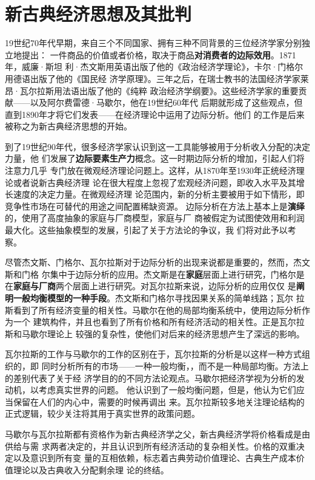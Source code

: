\part{新古典经济思想及其批判}

19世纪70年代早期，来自三个不同国家、拥有三种不同背景的三位经济学家分别独立地提出：
一件商品的价值或者价格，取决于商品\textbf{对消费者的边际效用}。1871年，威廉·斯坦
利·杰文斯用英语出版了他的《政治经济学理论》，卡尔·门格尔用德语出版了他的《国民经
济学原理》。三年之后，在瑞士教书的法国经济学家莱昂·瓦尔拉斯用法语出版了他的《纯粹
政治经济学纲要》。这些经济学家的重要贡献——以及阿尔费雷德·马歇尔，他在19世纪60年代
后期就形成了这些观点，但直到1890年才将它们发表——在经济理论中运用了边际分析。他们
的工作是后来被称之为新古典经济思想的开始。

到了19世纪90年代，很多经济学家认识到这一工具能够被用于分析收入分配的决定力量，他
们发展了\textbf{边际要素生产力}概念。这一时期边际分析的增加，引起人们将注意力几乎
专门放在微观经济理论问题上。这样，从1870年至1930年正统经济理论或者说新古典经济理
论在很大程度上忽视了宏观经济问题，即收入水平及其增长速度的决定力量。在微观经济理
论范围内，新的分析主要被用于如下情形，即竞争性市场在可替代的用途之间配置稀缺资源。
边际分析在方法上基本上是\textbf{演绎}的，使用了高度抽象的家庭与厂商模型，家庭与厂
商被假定为试图使效用和利润最大化。这些抽象模型的发展，引起了关于方法论的争议，我
们将对此予以考察。

尽管杰文斯、门格尔、瓦尔拉斯对于边际分析的出现来说都是重要的，然而，杰文斯和门格
尔集中于边际分析的应用。杰文斯是在\textbf{家庭}层面上进行研究，门格尔是
在\textbf{家庭与厂商}两个层面上进行研究。对瓦尔拉斯来说，边际分析的应用仅仅
是\textbf{阐明一般均衡模型的一种手段}。杰文斯和门格尔寻找因果关系的简单线路；瓦尔
拉斯看到了所有经济变量的相关性。马歇尔在他的局部均衡系统中，使用边际分析作为一个
建筑构件，并且也看到了所有价格和所有经济活动的相关性。正是瓦尔拉斯和马歇尔理论上
较强的复杂性，使他们对后来的经济思想产生了深远的影响。

瓦尔拉斯的工作与马歇尔的工作的区别在于，瓦尔拉斯的分析是以这样一种方式组织的，即
同时分析所有的市场——一种一般均衡，，而不是一种局部均衡。方法上的差别代表了关于经
济学目的的不同方法论观点。马歇尔把经济学视为分析的发动机，以考虑真实世界的问题。
他认识到了一般均衡问题，但是，他认为它们应当保留在人们的内心中，需要的时候再调出
来。瓦尔拉斯较多地关注理论结构的正式逻辑，较少关注将其用于真实世界的政策问题。

马歇尔与瓦尔拉斯都有资格作为新古典经济学之父，新古典经济学将价格看成是由供给与需
求两者决定的，并且认识到所有经济活动的复杂相关性。价格的双重决定以及意识到所有变
量的互相依赖，标志着古典劳动价值理论、古典生产成本价值理论以及古典收入分配剩余理
论的终结。

